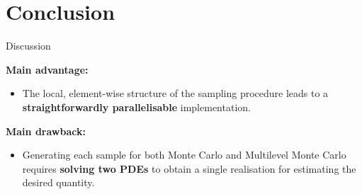 \documentclass[
  english,            %
  aspectratio=169,    %
]{tumbeamer}
\begin{document}
\section{Conclusion}

\begin{frame}{Discussion}

\textbf{Main advantage:}
\begin{itemize}
  \item[\textbullet] The local, element-wise structure of the sampling procedure
    leads to a \textbf{straightforwardly parallelisable} implementation.
\end{itemize}

\bigskip
\textbf{Main drawback:}
\begin{itemize}
  \item[\textbullet] Generating each sample for both Monte Carlo and Multilevel Monte Carlo
    requires \textbf{solving two PDEs} to obtain a single realisation for estimating the
    desired quantity.
\end{itemize}    

\end{frame}
\end{document}
